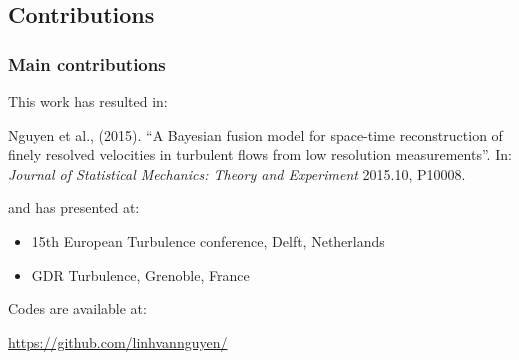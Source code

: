 \documentclass{beamer}
\let\olditem\item
\renewcommand{\item}{\setlength{\itemsep}{\fill}\olditem}
\begin{document}
\subsection[Contributions]{Contributions}
\begin{frame}
\frametitle{Main contributions}
	\begin{minipage}{\textwidth}
		\begin{minipage}[t]{0.375\textwidth}
				This work has resulted in:
				
				{\scriptsize Nguyen et al., (2015). ``A Bayesian fusion model for space-time reconstruction of finely resolved velocities in turbulent flows from low resolution
				measurements''. In: \textit{Journal of Statistical Mechanics: Theory and Experiment} 2015.10, P10008.}
				
				
				and has presented at:
				\begin{itemize}\itemsep0em
					\item \scriptsize 15th European Turbulence conference, Delft, Netherlands
					\item \scriptsize GDR Turbulence, Grenoble, France
				\end{itemize}
				
				Codes are available at:
				
				{\tiny \url{https://github.com/linhvannguyen/}}
				

\end{minipage}
\end{minipage}
\end{frame}
\end{document}

